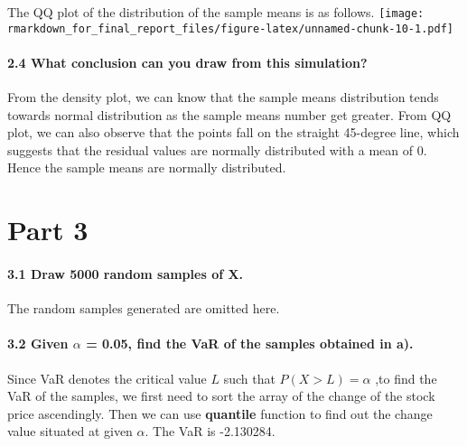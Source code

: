 \documentclass[]{article}
\let\oldparagraph\paragraph
\renewcommand{\paragraph}[1]{\oldparagraph{#1}\mbox{}}
\begin{document}
The QQ plot of the distribution of the sample means is as follows.
\texttt{[image: rmarkdown\_for\_final\_report\_files/figure-latex/unnamed-chunk-10-1.pdf]}

\hypertarget{what-conclusion-can-you-draw-from-this-simulation}{%
\paragraph{\texorpdfstring{\textbf{2.4 What conclusion can you draw from
this
simulation?}}{2.4 What conclusion can you draw from this simulation?}}\label{what-conclusion-can-you-draw-from-this-simulation}}

From the density plot, we can know that the sample means distribution
tends towards normal distribution as the sample means number get
greater. From QQ plot, we can also observe that the points fall on the
straight 45-degree line, which suggests that the residual values are
normally distributed with a mean of 0. Hence the sample means are
normally distributed.

\hypertarget{part-3}{%
\section{Part 3}\label{part-3}}

\hypertarget{draw-5000-random-samples-of-x.}{%
\paragraph{\texorpdfstring{\textbf{3.1 Draw 5000 random samples of
X.}}{3.1 Draw 5000 random samples of X.}}\label{draw-5000-random-samples-of-x.}}

The random samples generated are omitted here.

\hypertarget{given-alpha-0.05-find-the-var-of-the-samples-obtained-in-a.}{%
\paragraph{\texorpdfstring{\textbf{3.2 Given \(\alpha\) = 0.05, find the
VaR of the samples obtained in a).
}}{3.2 Given \textbackslash alpha = 0.05, find the VaR of the samples obtained in a). }}\label{given-alpha-0.05-find-the-var-of-the-samples-obtained-in-a.}}

Since VaR denotes the critical value \(L\) such that \(P(X>L)=\alpha\)
,to find the VaR of the samples, we first need to sort the array of the
change of the stock price ascendingly. Then we can use \textbf{quantile}
function to find out the change value situated at given \(\alpha\). The
VaR is -2.130284.
\end{document}
